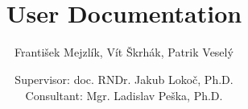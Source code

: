 \documentclass[10pt,a4paper]{article}
\title{\textcool{\bf SOMHunter Video Search Tool} \\ User Documentation}
\author{František Mejzlík, Vít Škrhák, Patrik Veselý}
\date{Supervisor: doc. RNDr. Jakub Lokoč, Ph.D. \\ \vspace{5mm} Consultant: Mgr. Ladislav Peška, Ph.D.}
\begin{document}
\maketitle
\pagebreak
\tableofcontents






 


\printindex
\begin{appendices}

\end{appendices}
\end{document}
